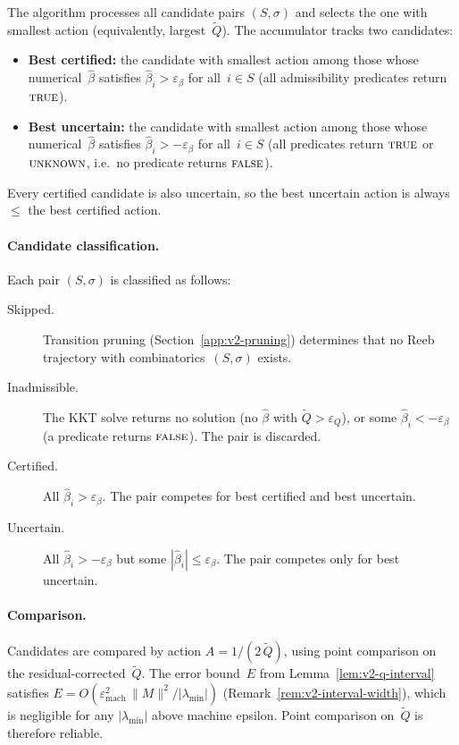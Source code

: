 
The algorithm processes all candidate pairs
$(S, \sigma)$ and selects the one with smallest
action (equivalently, largest~$\tilde Q$).
The accumulator tracks two candidates:
\begin{itemize}
\item \textbf{Best certified:}
  the candidate with smallest action among those whose
  numerical~$\hat\beta$ satisfies
  $\hat\beta_i > \varepsilon_\beta$ for all~$i \in S$
  (all admissibility predicates return $\textsc{true}$).
\item \textbf{Best uncertain:}
  the candidate with smallest action among those whose
  numerical~$\hat\beta$ satisfies
  $\hat\beta_i > -\varepsilon_\beta$ for all~$i \in S$
  (all predicates return $\textsc{true}$ or
  $\textsc{unknown}$, i.e.\ no predicate returns
  $\textsc{false}$).
\end{itemize}
Every certified candidate is also uncertain, so
the best uncertain action is always~$\leq$
the best certified action.

\paragraph{Candidate classification.}
Each pair $(S, \sigma)$ is classified as follows:
\begin{description}
\item[Skipped.]
  Transition pruning
  (Section~\ref{app:v2-pruning})
  determines that no Reeb trajectory with
  combinatorics~$(S, \sigma)$ exists.

\item[Inadmissible.]
  The KKT solve returns no solution
  (no $\hat\beta$ with
  $\tilde Q > \varepsilon_Q$), or some
  $\hat\beta_i < -\varepsilon_\beta$
  (a predicate returns $\textsc{false}$).
  The pair is discarded.

\item[Certified.]
  All $\hat\beta_i > \varepsilon_\beta$.
  The pair competes for best certified
  and best uncertain.

\item[Uncertain.]
  All $\hat\beta_i > -\varepsilon_\beta$
  but some $|\hat\beta_i| \leq \varepsilon_\beta$.
  The pair competes only for best uncertain.
\end{description}

\paragraph{Comparison.}
Candidates are compared by action
$A = 1/(2\,\tilde Q)$,
using point comparison on the
residual-corrected~$\tilde Q$.
The error bound~$E$ from
Lemma~\ref{lem:v2-q-interval} satisfies
$E = O(\varepsilon_{\mathrm{mach}}^2\,\|M\|^2
  / |\lambda_{\min}|)$
(Remark~\ref{rem:v2-interval-width}),
which is negligible for any
$|\lambda_{\min}|$ above machine epsilon.
Point comparison on~$\tilde Q$ is therefore reliable.


